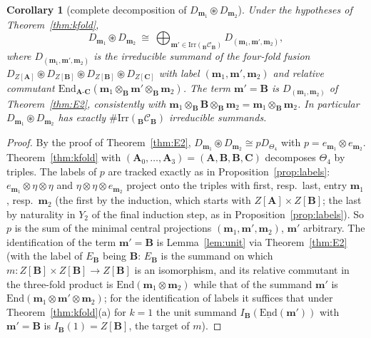 \documentclass[11pt]{article}
\newtheorem{corollary}[theorem]{Corollary}
\theoremstyle{definition}
\theoremstyle{remark}
\newcommand{\bfB}{\mathbf B}
\newcommand{\bfA}{\mathbf A}
\newcommand{\bfC}{\mathbf C}
\newcommand{\cfus}{\circledast}
\begin{document}
\begin{corollary}[complete decomposition of $D_{\mathbf m_1}\cfus D_{\mathbf m_2}$]\label{cor:complete}
Under the hypotheses of Theorem~\ref{thm:kfold},
\[
D_{\mathbf m_1}\cfus D_{\mathbf m_2}\ \cong\ \bigoplus_{\mathbf m'\in\mathrm{Irr}({}_{\bfB}\mathcal C_{\bfB})}D_{(\mathbf m_1,\mathbf m',\mathbf m_2)},
\]
where $D_{(\mathbf m_1,\mathbf m',\mathbf m_2)}$ is the irreducible summand of the four-fold fusion $D_{Z[\bfA]}\cfus D_{Z[\bfB]}\cfus D_{Z[\bfB]}\cfus D_{Z[\bfC]}$ with label $(\mathbf m_1,\mathbf m',\mathbf m_2)$ and relative commutant $\mathrm{End}_{\bfA\text{-}\bfC}(\mathbf m_1\otimes_{\bfB}\mathbf m'\otimes_{\bfB}\mathbf m_2)$. The term $\mathbf m'=\bfB$ is $D_{(\mathbf m_1,\mathbf m_2)}$ of Theorem~\ref{thm:E2}, consistently with $\mathbf m_1\otimes_{\bfB}\bfB\otimes_{\bfB}\mathbf m_2=\mathbf m_1\otimes_{\bfB}\mathbf m_2$. In particular $D_{\mathbf m_1}\cfus D_{\mathbf m_2}$ has exactly $\#\mathrm{Irr}({}_{\bfB}\mathcal C_{\bfB})$ irreducible summands.
\end{corollary}
\begin{proof}
By the proof of Theorem~\ref{thm:E2}, $D_{\mathbf m_1}\cfus D_{\mathbf m_2}\cong pD_{\Theta_4}$ with $p=e_{\mathbf m_1}\otimes e_{\mathbf m_2}$. Theorem~\ref{thm:kfold} with $(\mathbf A_0,\dots,\mathbf A_3)=(\bfA,\bfB,\bfB,\bfC)$ decomposes $\Theta_4$ by triples. The labels of $p$ are tracked exactly as in Proposition~\ref{prop:labels}: $e_{\mathbf m_1}\otimes\eta\otimes\eta$ and $\eta\otimes\eta\otimes e_{\mathbf m_2}$ project onto the triples with first, resp.\ last, entry $\mathbf m_1$, resp.\ $\mathbf m_2$ (the first by the induction, which starts with $Z[\bfA]\times Z[\bfB]$; the last by naturality in $Y_2$ of the final induction step, as in Proposition~\ref{prop:labels}). So $p$ is the sum of the minimal central projections $(\mathbf m_1,\mathbf m',\mathbf m_2)$, $\mathbf m'$ arbitrary. The identification of the term $\mathbf m'=\bfB$ is Lemma~\ref{lem:unit} via Theorem~\ref{thm:E2} (with the label of $E_{\bfB}$ being $\bfB$: $E_{\bfB}$ is the summand on which $m\colon Z[\bfB]\times Z[\bfB]\to Z[\bfB]$ is an isomorphism, and its relative commutant in the three-fold product is $\mathrm{End}(\mathbf m_1\otimes\mathbf m_2)$ while that of the summand $\mathbf m'$ is $\mathrm{End}(\mathbf m_1\otimes\mathbf m'\otimes\mathbf m_2)$; for the identification of labels it suffices that under Theorem~\ref{thm:kfold}(a) for $k=1$ the unit summand $I_{\bfB}(\underline{\mathrm{End}}(\mathbf m'))$ with $\mathbf m'=\bfB$ is $I_{\bfB}(1)=Z[\bfB]$, the target of $m$).
\end{proof}
\end{document}
